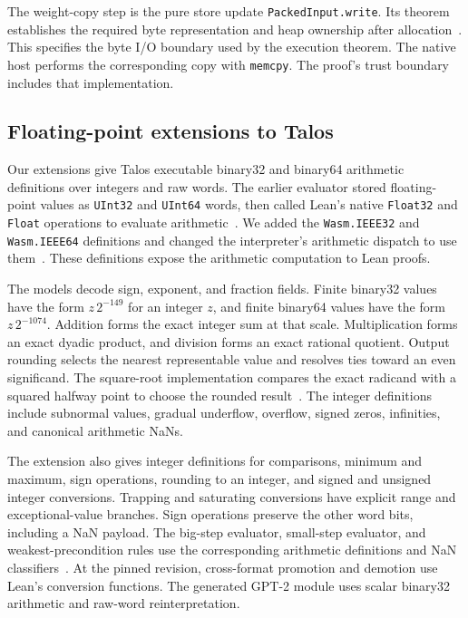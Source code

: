 \documentclass[11pt]{article}
\newcommand{\code}[1]{\texttt{#1}}
\begin{document}
The weight-copy step is the pure store update \code{PackedInput.write}.  Its theorem establishes the required byte representation and heap ownership after allocation~\cite{input}.  This specifies the byte I/O boundary used by the execution theorem.  The native host performs the corresponding copy with \code{memcpy}.  The proof's trust boundary includes that implementation.

\subsection{Floating-point extensions to Talos}\label{sec:talosfp}

Our extensions give Talos executable binary32 and binary64 arithmetic definitions over integers and raw words.  The earlier evaluator stored floating-point values as \code{UInt32} and \code{UInt64} words, then called Lean's native \code{Float32} and \code{Float} operations to evaluate arithmetic~\cite{talosbefore}.  We added the \code{Wasm.IEEE32} and \code{Wasm.IEEE64} definitions and changed the interpreter's arithmetic dispatch to use them~\cite{talosfp,talosdispatch}.  These definitions expose the arithmetic computation to Lean proofs.

The models decode sign, exponent, and fraction fields.  Finite binary32 values have the form $z\,2^{-149}$ for an integer $z$, and finite binary64 values have the form $z\,2^{-1074}$.  Addition forms the exact integer sum at that scale.  Multiplication forms an exact dyadic product, and division forms an exact rational quotient.  Output rounding selects the nearest representable value and resolves ties toward an even significand.  The square-root implementation compares the exact radicand with a squared halfway point to choose the rounded result~\cite{talosfp}.  The integer definitions include subnormal values, gradual underflow, overflow, signed zeros, infinities, and canonical arithmetic NaNs.

The extension also gives integer definitions for comparisons, minimum and maximum, sign operations, rounding to an integer, and signed and unsigned integer conversions.  Trapping and saturating conversions have explicit range and exceptional-value branches.  Sign operations preserve the other word bits, including a NaN payload.  The big-step evaluator, small-step evaluator, and weakest-precondition rules use the corresponding arithmetic definitions and NaN classifiers~\cite{talosdispatch,talosfpproofs}.  At the pinned revision, cross-format promotion and demotion use Lean's conversion functions.  The generated GPT-2 module uses scalar binary32 arithmetic and raw-word reinterpretation.
\end{document}
